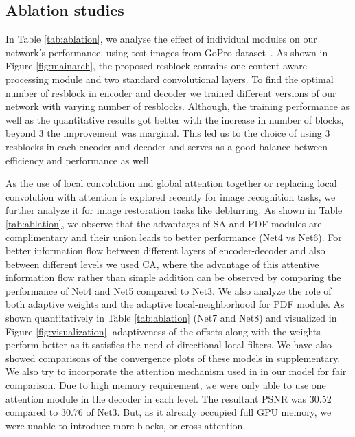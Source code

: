 \documentclass[10pt,twocolumn,letterpaper]{article}
\begin{document}
\subsection{Ablation studies}
In Table \ref{tab:ablation}, we analyse the effect of individual modules on our network's performance, using  test images from GoPro dataset~\cite{nah2017deep}. As shown in Figure \ref{fig:mainarch}, the proposed resblock contains one content-aware processing module and two standard convolutional layers. To find the optimal number of resblock in encoder and decoder we trained different versions of our network with varying number of resblocks. Although, the training performance as well as the quantitative results got better with the increase in number of blocks, beyond 3 the improvement was marginal. This led us to the choice of using 3 resblocks in each encoder and decoder and serves as a good balance between efficiency and performance as well.


As the use of local convolution and global attention together \cite{bello2019attention} or replacing local convolution with attention \cite{ramachandran2019stand} is explored recently for image recognition tasks, we further analyze it for image restoration tasks like deblurring. As shown in Table \ref{tab:ablation}, we observe that the advantages of SA and PDF modules are complimentary and their union leads to better performance (Net4 vs Net6). For better information flow between different layers of encoder-decoder and also between different levels we used CA, where the advantage of this attentive information flow rather than simple addition can be observed by comparing the performance of Net4 and Net5 compared to Net3. We also analyze the role of both adaptive weights and the adaptive local-neighborhood for PDF module. As shown quantitatively in Table \ref{tab:ablation} (Net7 and Net8) and visualized in Figure \ref{fig:visualization}, adaptiveness of the offsets along with the weights perform better as it satisfies the need of directional local filters. We have also showed comparisons of the convergence plots of these models in supplementary. We also try to incorporate the attention mechanism used in \cite{bello2019attention} in our model for fair comparison. Due to high memory requirement, we were only able to use one attention module in the decoder in each level. The resultant PSNR was 30.52 compared to 30.76 of Net3. But, as it already occupied full GPU memory, we were unable to introduce more blocks, or cross attention.
\end{document}
